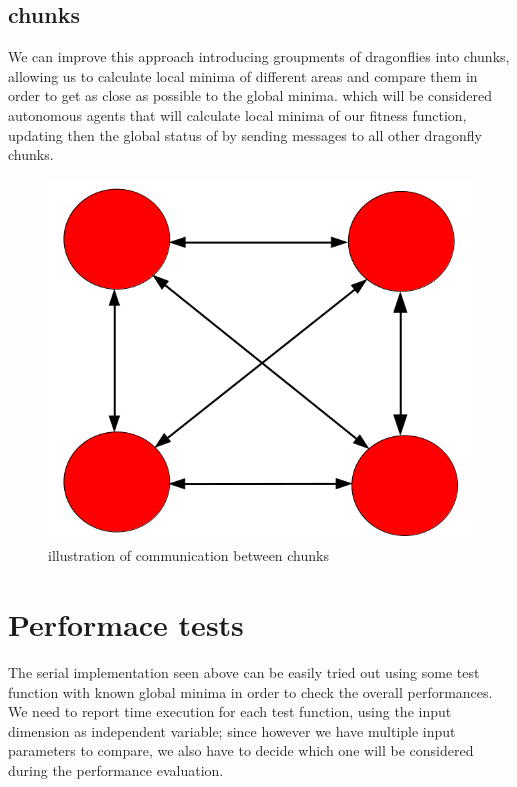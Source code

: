 \documentclass[10pt]{article}
\begin{document}
\begin{multicols}{2}
\subsection*{chunks}
We can improve this approach introducing groupments of dragonflies into chunks, 
allowing us to calculate local minima of different areas and compare them in order
to get as close as possible to the global minima. which will be considered
autonomous agents that will calculate local minima of our fitness function, updating then the 
global status of by sending messages to all other dragonfly chunks. 

\begin{figure}[H]
  \includegraphics[scale=0.3]{chunks.png}
  \caption{illustration of communication between chunks}
\end{figure}


\section{Performace tests}

The serial implementation seen above can be easily tried out using some test function 
with known global minima in order to check the overall performances. We need to 
report time execution for each test function, using the input dimension as independent variable;
since however we have multiple input parameters to compare, we also have to decide which one will 
be considered during the performance evaluation.


\end{multicols}
\end{document}
